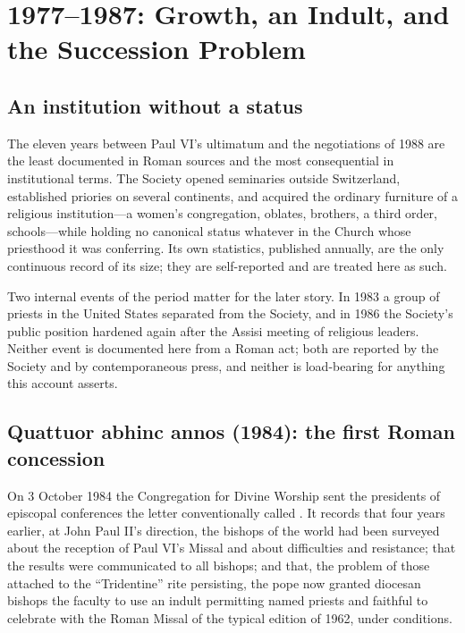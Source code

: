 \section{1977--1987: Growth, an Indult, and the Succession Problem}

\subsection{An institution without a status}

The eleven years between Paul VI's ultimatum and the negotiations of 1988
are the least documented in Roman sources and the most consequential in
institutional terms. The Society opened seminaries outside Switzerland,
established priories on several continents, and acquired the ordinary
furniture of a religious institution---a women's congregation, oblates,
brothers, a third order, schools---while holding no canonical status
whatever in the Church whose priesthood it was conferring. Its own
statistics, published annually, are the only continuous record of its
size; they are self-reported and are treated here as such.

Two internal events of the period matter for the later story. In 1983 a
group of priests in the United States separated from the Society, and in
1986 the Society's public position hardened again after the Assisi
meeting of religious leaders. Neither event is documented here from a
Roman act; both are reported by the Society and by contemporaneous press,
and neither is load-bearing for anything this account asserts.

\subsection{Quattuor abhinc annos (1984): the first Roman concession}

On 3 October 1984 the Congregation for Divine Worship sent the presidents
of episcopal conferences the letter conventionally called . It records that four years earlier, at John Paul II's
direction, the bishops of the world had been surveyed about the reception
of Paul VI's Missal and about difficulties and resistance; that the
results were communicated to all bishops; and that, the problem of those
attached to the ``Tridentine'' rite persisting, the pope now granted
diocesan bishops the faculty to use an indult permitting named priests
and faithful to celebrate with the Roman Missal of the typical edition of
1962, under conditions.

